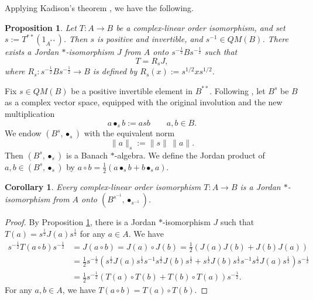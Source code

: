 \documentclass[12pt]{amsart}
\newtheorem{proposition}[theorem]{Proposition}
\newtheorem{corollary}[theorem]{Corollary}
\theoremstyle{remark}
\begin{document}
Applying Kadison's theorem \cite{Kadison}, we have the following.
\begin{proposition}\cite[Remark 4.3(ii)]{BrownOrder}\label{BrownO}
Let $T\colon A\to B$ be a complex-linear order
isomorphism, and set
 $s:=T^{**}(1_{A^{**}})$. 
Then $s$ is positive and invertible, and $s^{-1}\in QM(B)$. There exists a Jordan
${*}$-isomorphism $J$ from $A$ onto $s^{-\frac{1}{2}}Bs ^{-\frac{1}{2}}$ 
such that \[
T=R_{s} J,
\]
where $ R_s:s^{-\frac{1}{2}}Bs ^{-\frac{1}{2}} \to B$ is defined by  $R_s(x):=s^{1/2}xs^{1/2}$. 

\end{proposition}
Fix $s \in QM(B)$ be a positive invertible element in $B^{**}$. Following \cite[Proposition~3.1]{BMS}, let $B^{s}$ be $B$ as a
complex vector space, equipped with the original involution and the
new multiplication \[
    a\mathbin{\bullet_s} b := asb
    \qquad a,b\in B.
\]
We endow $(B^s, \mathbin{\bullet_s})$  with the equivalent norm
\[
    \|a\|_s := \|s\|\,\|a\|.
\]
Then $(B^s, \mathbin{\bullet_s})$ is a Banach $*$-algebra. We define the Jordan product of $a, b \in  (B^s, \mathbin{\bullet_s})$ by $a \circ b=\frac{1}{2}(a\mathbin{\bullet_s}b+b\mathbin{\bullet_s} a)$. 
\begin{corollary} Every complex-linear order isomorphism $T\colon A\to B$ is a Jordan $*$-isomorphism from $A$ onto $(B^{s^{-1}}, \mathbin{\bullet_{s^{-1}}})$. 
\end{corollary}
\begin{proof}
    By Proposition \ref{BrownO}, there is a Jordan $*$-isomorphism $J$ such that $T(a)=s^{\frac{1}{2}}J(a)s^{\frac{1}{2}}$ for any $a \in A$. We have
    \begin{equation*}
\begin{split}
    s^{-\frac{1}{2}}T(a \circ b)s^{-\frac{1}{2}}&=J(a \circ b)=J(a) \circ J(b)
    =\frac{1}{2}(J(a)J(b)+J(b)J(a))\\
    &=\frac{1}{2} s^{-\frac{1}{2}}(s^{\frac{1}{2}}J(a)s^{\frac{1}{2}}s^{-1}s^{\frac{1}{2}}J(b)s^{\frac{1}{2}}+s^{\frac{1}{2}}J(b)s^{\frac{1}{2}}s^{-1}s^{\frac{1}{2}}J(a)s^{\frac{1}{2}})s^{-\frac{1}{2}}\\
    &=\frac{1}{2} s^{-\frac{1}{2}}(T(a)\circ T(b)+T(b)\circ T(a))s^{-\frac{1}{2}}.
\end{split}
    \end{equation*}
    For any $a,b\in A$, we have 
    $T(a\circ b)
    =
    T(a)\circ T(b)$.
\end{proof}
\end{document}
